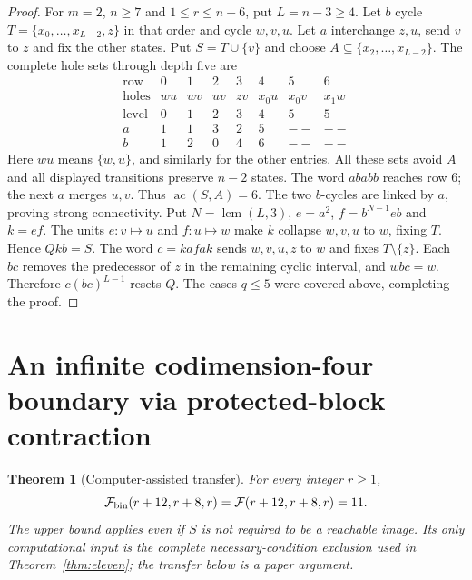\documentclass[10pt]{article}
\newtheorem{theorem}{Theorem}
\newcommand{\ac}{\operatorname{ac}}
\newcommand{\Max}{\mathcal F}
\begin{document}
\begin{proof}
For $m=2$, $n\ge7$ and $1\le r\le n-6$, put $L=n-3\ge4$.
Let $b$ cycle $T=\{x_0,\ldots,x_{L-2},z\}$ in that order and cycle $w,v,u$.
Let $a$ interchange $z,u$, send $v$ to $z$ and fix the other states.
Put $S=T\cup\{v\}$ and choose $A\subseteq\{x_2,\ldots,x_{L-2}\}$.
The complete hole sets through depth five are
\[
\begin{array}{c|ccccccc}
\text{row}&0&1&2&3&4&5&6\\\hline
\text{holes}&wu&wv&uv&zv&x_0u&x_0v&x_1w\\
\text{level}&0&1&2&3&4&5&5\\
a&1&1&3&2&5&--&--\\
b&1&2&0&4&6&--&--
\end{array}
\]
Here $wu$ means $\{w,u\}$, and similarly for the other entries.
All these sets avoid $A$ and all displayed transitions preserve $n-2$ states.
The word $ababb$ reaches row 6; the next $a$ merges $u,v$.
Thus $\ac(S,A)=6$.
The two $b$-cycles are linked by $a$, proving strong connectivity.
Put $N=\operatorname{lcm}(L,3)$, $e=a^2$, $f=b^{N-1}eb$ and $k=ef$.
The units $e:v\mapsto u$ and $f:u\mapsto w$ make $k$ collapse $w,v,u$ to $w$,
fixing $T$. Hence $Qkb=S$.
The word $c=kafak$ sends $w,v,u,z$ to $w$ and fixes $T\setminus\{z\}$.
Each $bc$ removes the predecessor of $z$ in the remaining cyclic interval,
and $wbc=w$. Therefore $c(bc)^{L-1}$ resets $Q$.
The cases $q\le5$ were covered above, completing the proof.
\end{proof}


\section{An infinite codimension-four boundary via protected-block contraction}
\begin{theorem}[Computer-assisted transfer]\label{thm:protected-strip}
For every integer $r\ge1$,
\[
 \Max_{\rm bin}(r+12,r+8,r)=\Max(r+12,r+8,r)=11.
\]
The upper bound applies even if $S$ is not required to be a reachable image.
Its only computational input is the complete necessary-condition exclusion used
in Theorem~\ref{thm:eleven}; the transfer below is a paper argument.
\end{theorem}
\end{document}
